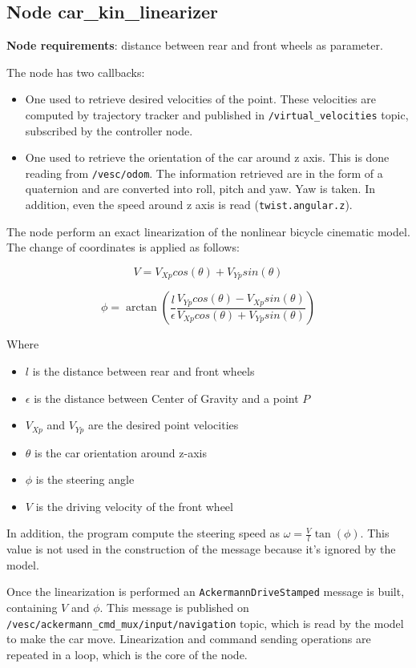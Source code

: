 \subsection{Node car\_kin\_linearizer}

\textbf{Node requirements}: distance between rear and front wheels as parameter.

The node has two callbacks:

\begin{itemize}
	\item One used to retrieve desired velocities of the point. These velocities are computed by trajectory tracker and published in \verb|/virtual_velocities| topic, subscribed by the controller node.
	\item One used to retrieve the orientation of the car around z axis. This is done reading from \verb|/vesc/odom|. The information retrieved are in the form of a quaternion and are converted into roll, pitch and yaw. Yaw is taken. In addition, even the speed around z axis is read (\verb|twist.angular.z|).
\end{itemize}

The node perform an exact linearization of the nonlinear bicycle cinematic model. The change of coordinates is applied as follows:

\[
V = V_{Xp}cos(\theta) + V_{Yp}sin(\theta)
\]

\[
\phi = \arctan\left(\frac{l}{\epsilon} \frac{ V_{Yp}cos(\theta) - V_{Xp}sin(\theta) }{ V_{Xp}cos(\theta) + V_{Yp}sin(\theta) }\right)
\]

Where 

\begin{itemize}
	\item $l$ is the distance between rear and front wheels
	\item $\epsilon$ is the distance between Center of Gravity and a point $P$
	\item $V_{Xp}$ and $V_{Yp}$ are the desired point velocities
	\item $\theta$ is the car orientation around z-axis
	\item $\phi$ is the steering angle
	\item $V$ is the driving velocity of the front wheel
\end{itemize}

In addition, the program compute the steering speed as $\omega = \frac{V}{l}\tan(\phi)$. This value is not used in the construction of the message because it's ignored by the model.

Once the linearization is performed an \verb|AckermannDriveStamped| message is built, containing $V$ and $\phi$. This message is published on \\ \verb|/vesc/ackermann_cmd_mux/input/navigation| topic, which is read by the model to make the car move. Linearization and command sending operations are repeated in a loop, which is the core of the node.